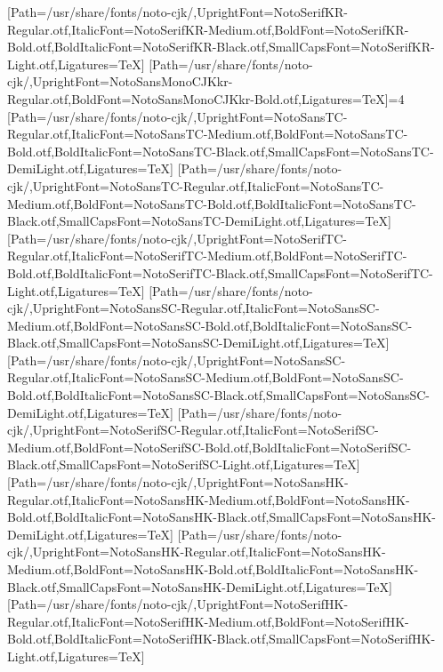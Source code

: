 \newfontfamily{}[Path=/usr/share/fonts/noto-cjk/,UprightFont=NotoSerifKR-Regular.otf,ItalicFont=NotoSerifKR-Medium.otf,BoldFont=NotoSerifKR-Bold.otf,BoldItalicFont=NotoSerifKR-Black.otf,SmallCapsFont=NotoSerifKR-Light.otf,Ligatures=TeX]
\newfontfamily{}[Path=/usr/share/fonts/noto-cjk/,UprightFont=NotoSansMonoCJKkr-Regular.otf,BoldFont=NotoSansMonoCJKkr-Bold.otf,Ligatures=TeX]\else\ifnum\value{NotoCJKFamily}=4
\newfontfamily{}[Path=/usr/share/fonts/noto-cjk/,UprightFont=NotoSansTC-Regular.otf,ItalicFont=NotoSansTC-Medium.otf,BoldFont=NotoSansTC-Bold.otf,BoldItalicFont=NotoSansTC-Black.otf,SmallCapsFont=NotoSansTC-DemiLight.otf,Ligatures=TeX]
\newfontfamily{}[Path=/usr/share/fonts/noto-cjk/,UprightFont=NotoSansTC-Regular.otf,ItalicFont=NotoSansTC-Medium.otf,BoldFont=NotoSansTC-Bold.otf,BoldItalicFont=NotoSansTC-Black.otf,SmallCapsFont=NotoSansTC-DemiLight.otf,Ligatures=TeX]
\newfontfamily{}[Path=/usr/share/fonts/noto-cjk/,UprightFont=NotoSerifTC-Regular.otf,ItalicFont=NotoSerifTC-Medium.otf,BoldFont=NotoSerifTC-Bold.otf,BoldItalicFont=NotoSerifTC-Black.otf,SmallCapsFont=NotoSerifTC-Light.otf,Ligatures=TeX]
\newfontfamily{}[Path=/usr/share/fonts/noto-cjk/,UprightFont=NotoSansSC-Regular.otf,ItalicFont=NotoSansSC-Medium.otf,BoldFont=NotoSansSC-Bold.otf,BoldItalicFont=NotoSansSC-Black.otf,SmallCapsFont=NotoSansSC-DemiLight.otf,Ligatures=TeX]
\newfontfamily{}[Path=/usr/share/fonts/noto-cjk/,UprightFont=NotoSansSC-Regular.otf,ItalicFont=NotoSansSC-Medium.otf,BoldFont=NotoSansSC-Bold.otf,BoldItalicFont=NotoSansSC-Black.otf,SmallCapsFont=NotoSansSC-DemiLight.otf,Ligatures=TeX]
\newfontfamily{}[Path=/usr/share/fonts/noto-cjk/,UprightFont=NotoSerifSC-Regular.otf,ItalicFont=NotoSerifSC-Medium.otf,BoldFont=NotoSerifSC-Bold.otf,BoldItalicFont=NotoSerifSC-Black.otf,SmallCapsFont=NotoSerifSC-Light.otf,Ligatures=TeX]
\newfontfamily{}[Path=/usr/share/fonts/noto-cjk/,UprightFont=NotoSansHK-Regular.otf,ItalicFont=NotoSansHK-Medium.otf,BoldFont=NotoSansHK-Bold.otf,BoldItalicFont=NotoSansHK-Black.otf,SmallCapsFont=NotoSansHK-DemiLight.otf,Ligatures=TeX]
\newfontfamily{}[Path=/usr/share/fonts/noto-cjk/,UprightFont=NotoSansHK-Regular.otf,ItalicFont=NotoSansHK-Medium.otf,BoldFont=NotoSansHK-Bold.otf,BoldItalicFont=NotoSansHK-Black.otf,SmallCapsFont=NotoSansHK-DemiLight.otf,Ligatures=TeX]
\newfontfamily{}[Path=/usr/share/fonts/noto-cjk/,UprightFont=NotoSerifHK-Regular.otf,ItalicFont=NotoSerifHK-Medium.otf,BoldFont=NotoSerifHK-Bold.otf,BoldItalicFont=NotoSerifHK-Black.otf,SmallCapsFont=NotoSerifHK-Light.otf,Ligatures=TeX]
